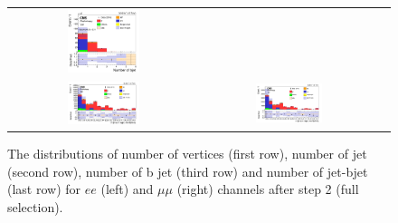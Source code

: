 \begin{figure}[ht]
\begin{center}
\begin{tabular}{ccc}
      \includegraphics[width=0.4\textwidth]{figures/tW/fig/Step2/mumu/H_N_b_jets.png}\\
      \includegraphics[width=0.4\textwidth]{figures/tW/fig/Step2/ee/H_njet_bjet.png}&
      \includegraphics[width=0.4\textwidth]{figures/tW/fig/Step2/mumu/H_njet_bjet.png}\\
    \end{tabular}
    \caption{The distributions of number of vertices (first row), number of jet (second row), number of b jet (third row) and number of jet-bjet (last row) for $ee$ (left) and $\mu\mu$ (right) channels after step 2 (full selection).
    \label{fig:step2_Nvtx_jet_bjet}}
  \end{center}
\end{figure}


